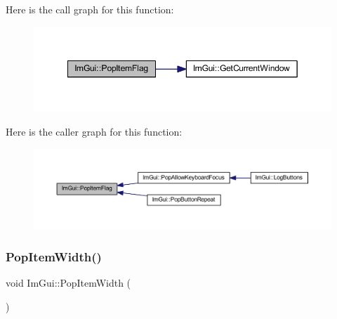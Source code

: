 Here is the call graph for this function\+:
\nopagebreak
\begin{figure}[H]
\begin{center}
\leavevmode
\includegraphics[width=349pt]{namespace_im_gui_aa93281155e1dd23715dbd384e91edc6b_cgraph}
\end{center}
\end{figure}
Here is the caller graph for this function\+:
\nopagebreak
\begin{figure}[H]
\begin{center}
\leavevmode
\includegraphics[width=350pt]{namespace_im_gui_aa93281155e1dd23715dbd384e91edc6b_icgraph}
\end{center}
\end{figure}
\mbox{\label{namespace_im_gui_ad29a3fc0cb5dfc7f9fc7224512ce90bf}} 
\subsubsection{\texorpdfstring{Pop\+Item\+Width()}{PopItemWidth()}}
{\footnotesize\ttfamily void Im\+Gui\+::\+Pop\+Item\+Width (\begin{DoxyParamCaption}{ }\end{DoxyParamCaption})}

